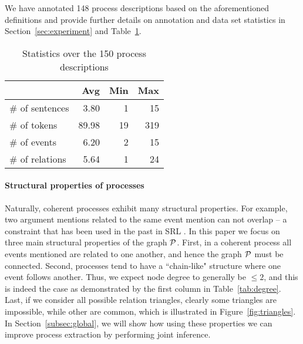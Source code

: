 We have annotated 148 process descriptions based on the aforementioned definitions and provide further details on annotation and data set statistics in Section~\ref{sec:experiment} and Table~\ref{tab:datastats}.

\begin{table}[t]
{\footnotesize
\hfill{}
\begin{tabular}{|l|r|r|r|}
\hline
&\textbf{Avg}&\textbf{Min} & \textbf{Max}\\
\hline
\# of sentences            &     3.80       &    1        &   15 \\ 
\# of tokens            &     89.98        &   19        & 319  \\ 
\# of events                &   6.20         &       2   &  15  \\ 
\# of relations          &     5.64       &      1        &  24 \\ 
\hline
\end{tabular}}
\hfill{}
\caption{Statistics over the 150 process descriptions}
\label{tab:datastats}
\end{table}

\paragraph{Structural properties of processes} 
Naturally, coherent processes exhibit many structural properties. For example, two argument mentions related to the same event mention can not overlap -- a constraint that has been used in the past in SRL \cite{Toutanova08}. In this paper we focus on three main structural properties of the graph $\mathcal{P}$. First, in a coherent process all events mentioned are related to one another, and hence the graph $\mathcal{P}$ must be connected. Second, processes tend to have a ``chain-like" structure where one event follows another. Thus, we expect node degree to generally be $\leq 2$, and this is indeed the case as demonstrated by the first column in Table~\ref{tab:degree}. Last, if we consider all possible relation triangles, clearly some triangles are impossible, while other are common, which is illustrated in Figure~\ref{fig:triangles}. In Section~\ref{subsec:global}, we will show how using these properties we can improve process extraction by performing joint inference.

